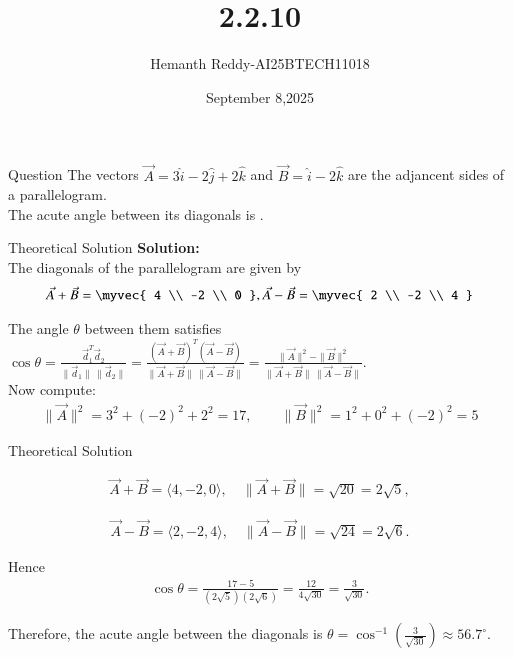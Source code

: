 \documentclass{beamer}
\title %
{2.2.10}
\date{September 8,2025}
\author %
{Hemanth Reddy-AI25BTECH11018}
\begin{document}
\frame{\titlepage}
\begin{frame}{Question}
The vectors $\vec{A} = 3\hat{i} - 2\hat{j} + 2\hat{k}$ and $\vec{B} = \hat{i} - 2\hat{k}$ are the adjancent sides of a parallelogram. \\
The acute angle between its diagonals is \underline{\hspace{2cm}}.
\end{frame}



\begin{frame}{Theoretical Solution}
\textbf{Solution:}\\


The diagonals of the parallelogram are given by\\

\begin{align}
\vec{A} + \vec{B} =
\myvec{
4 \\
-2 \\
0
}
, \vec{A} - \vec{B} =
\myvec{
2 \\
-2 \\
4
}
\end{align}

The angle $\theta$ between them satisfies
$
\cos\theta 
= \frac{\vec{d}_1 ^{T}\vec{d}_2}{\|\vec{d}_1\| \, \|\vec{d}_2\|}
= \frac{(\vec{A}+\vec{B})^{T}(\vec{A}-\vec{B})}{\|\vec{A}+\vec{B}\| \, \|\vec{A}-\vec{B}\|}
= \frac{\|\vec{A}\|^2 - \|\vec{B}\|^2}{\|\vec{A}+\vec{B}\| \, \|\vec{A}-\vec{B}\|}.
$\\
\vspace{0.3cm}
Now compute:
\begin{align}
\|\vec{A}\|^2 = 3^2 + (-2)^2 + 2^2 = 17,
\qquad
\|\vec{B}\|^2 = 1^2 + 0^2 + (-2)^2 = 5
\end{align}


\end{frame}

\begin{frame}{Theoretical Solution}
\begin{center}
\begin{align}
    \vec{A} + \vec{B} = \langle 4, -2, 0 \rangle, 
\quad \|\vec{A}+\vec{B}\| = \sqrt{20} = 2\sqrt{5},
\end{align}

\begin{align}
    \vec{A} - \vec{B} = \langle 2, -2, 4 \rangle, 
\quad \|\vec{A}-\vec{B}\| = \sqrt{24} = 2\sqrt{6}.
\end{align}

Hence
\begin{align}
    \cos\theta 
= \frac{17 - 5}{(2\sqrt{5})(2\sqrt{6})} 
= \frac{12}{4\sqrt{30}} 
= \frac{3}{\sqrt{30}}.
\end{align}



\vspace{0.3cm}
Therefore, the acute angle between the diagonals is
$
\theta = \cos^{-1}\!\left(\frac{3}{\sqrt{30}}\right) \approx 56.7^\circ.
$

\end{center}

\end{frame}
\end{document}
